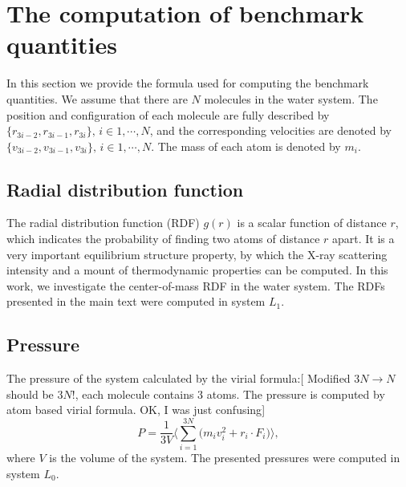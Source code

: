 \documentclass[a4paper,preprint,unsortedaddress,onecolumn,fleqn]{revtex4}
\begin{document}
\bigskip

\appendix

\section{The computation of benchmark quantities}

\label{appendix:benchmark}

In this section we provide the formula used for computing the benchmark
quantities. We assume that there are $N$ molecules in the water system. The
position and configuration of each molecule are fully described by $\{%
\mathbf{\mathit{r}}_{3i-2},\mathbf{\mathit{r}}_{3i-1},\mathbf{\mathit{r}}%
_{3i}\},\,i\in 1,\cdots ,N$, and the corresponding velocities are denoted by 
$\{\mathbf{\mathit{v}}_{3i-2},\mathbf{\mathit{v}}_{3i-1},\mathbf{\mathit{v}}%
_{3i}\},\,i\in 1,\cdots ,N$. The mass of each atom is denoted by $m_{i}$.

\subsection{Radial distribution function}

The radial distribution function (RDF) $g(r)$ is a scalar function of
distance $r$, which indicates the probability of finding two atoms of
distance $r$ apart. It is a very important equilibrium structure property,
by which the X-ray scattering intensity and a mount of thermodynamic
properties can be computed. In this work, we investigate the center-of-mass
RDF in the water system. The RDFs presented in the main text were computed
in system $L_1$.


\subsection{Pressure}

The pressure of the system calculated by the virial formula:[ {\color{blue}
Modified $3N\longrightarrow N$} {\color{red} should be $3N$!, each molecule
contains 3 atoms. The pressure is computed by atom based virial formula. %
\color{blue} OK, I was just confusing}]%
\begin{equation*}
P=\frac{1}{3V}\Bigg\langle\sum_{i=1}^{3N}\Big(m_{i}\mathbf{\mathit{v}}%
_{i}^{2}+\mathbf{\mathit{r}}_{i}\cdot \mathbf{\mathit{F}}_{i}\Big)%
\Bigg\rangle,
\end{equation*}%
where $V$ is the volume of the system. The presented pressures were computed
in system $L_{0}$.
\end{document}
